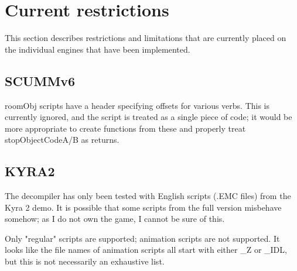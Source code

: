 \section{Current restrictions}
This section describes restrictions and limitations that are currently placed on the individual engines that have been implemented.

\subsection{SCUMMv6}
roomObj scripts have a header specifying offsets for various verbs. This is currently ignored, and the script is treated as a single piece of code; it would be more appropriate to create functions from these and properly treat stopObjectCodeA/B as returns.

\subsection{KYRA2}
The decompiler has only been tested with English scripts (.EMC files) from the Kyra 2 demo. It is possible that some scripts from the full version misbehave somehow; as I do not own the game, I cannot be sure of this.

Only "regular" scripts are supported; animation scripts are not supported. It looks like the file names of animation scripts all start with either \_Z or \_IDL, but this is not necessarily an exhaustive list.
